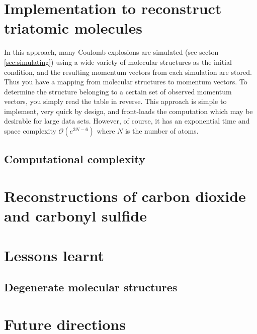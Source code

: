 \section{Implementation to reconstruct triatomic molecules}
In this approach, many Coulomb explosions are simulated (see secton \ref{sec:simulating}) using a wide variety of molecular structures as the initial condition, and the resulting momentum vectors from each simulation are stored. Thus you have a mapping from molecular structures to momentum vectors. To determine the structure belonging to a certain set of observed momentum vectors, you simply read the table in reverse. This approach is simple to implement, very quick by design, and front-loads the computation which may be desirable for large data sets. However, of course, it has an exponential time and space complexity $\mathcal{O}(e^{3N-6})$ where $N$ is the number of atoms.

\subsection{Computational complexity}

\section{Reconstructions of carbon dioxide and carbonyl sulfide}

\section{Lessons learnt}
\subsection{Degenerate molecular structures}

\section{Future directions}